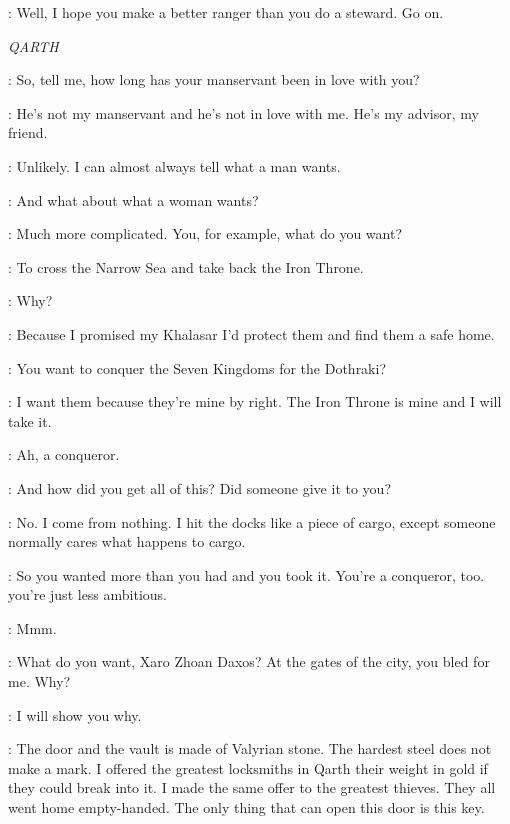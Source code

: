 \JEOR: Well, I hope you make a better ranger than you do a steward. Go on. 


\scene

\textit{QARTH} 


\XARO: So, tell me, how long has your manservant been in love with you? 

\DAENERYS: He's not my manservant and he's not in love with me. He's my advisor, my friend. 

\XARO: Unlikely. I can almost always tell what a man wants. 

\DAENERYS: And what about what a woman wants? 

\XARO: Much more complicated. You, for example, what do you want? 

\DAENERYS: To cross the Narrow Sea and take back the Iron Throne. 

\XARO: Why? 

\DAENERYS: Because I promised my Khalasar I'd protect them and find them a safe home. 

\XARO:  You want to conquer the Seven Kingdoms for the Dothraki? 

\DAENERYS: I want them because they're mine by right. The Iron Throne is mine and I will take it. 

\XARO: Ah, a conqueror. 

\DAENERYS: And how did you get all of this? Did someone give it to you? 

\XARO: No. I come from nothing. I hit the docks like a piece of cargo, except someone normally cares what happens to cargo. 

\DAENERYS: So you wanted more than you had and you took it. You're a conqueror, too. you're just less ambitious. 


\XARO: Mmm. 

\DAENERYS: What do you want, Xaro Zhoan Daxos? At the gates of the city, you bled for me. Why? 

\XARO: I will show you why. 


\XARO: The door and the vault is made of Valyrian stone. The hardest steel does not make a mark. I offered the greatest locksmiths in Qarth their weight in gold if they could break into it. I made the same offer to the greatest thieves. They all went home empty-handed. The only thing that can open this door is this key. 

